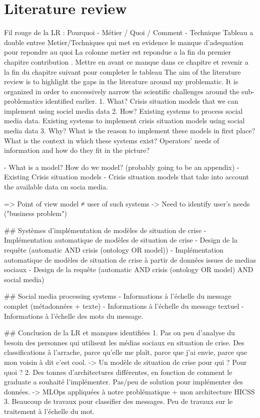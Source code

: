 \chapter{Literature review}

Fil rouge de la LR : Pourquoi - Métier / Quoi / Comment - Technique
Tableau a double entree Metier/Techniques qui met en evidence le manque d'adequation pour repondre au quoi
La colonne metier est repondue a la fin du premier chapitre contribution . Mettre en avant ce manque dans ce chapitre et revenir a la fin du chapitre suivant pour completer le tableau
The aim of the literature review is to highlight the gaps in the literature around my problematic.
It is organized in order to successively narrow the scientific challenges around the sub-problematics identified earlier.
1. What? Crisis situation models that we can implement using sociel media data
2. How? Existing systems to process social media data. Existing systems to implement crisis situation models using social media data
3. Why? What is the reason to implement these models in first place? What is the context in which these systems exist? Operators' needs of information and how do they fit in the picture?

- What is a model? How do we model? (probably going to be an appendix)
- Existing Crisis situation models
- Crisis situation models that take into account the available data on socia media.

=> Point of view model ≠ user of such systems
-> Need to identify user's needs ("business problem")

## Systèmes d'implémentation de modèles de situation de crise
- Implémentation automatique de modèles de situation de crise
- Design de la requête (automatic AND crisis (ontology OR model))
- Implémentation automatique de modèles de situation de crise à partir de données issues de medias sociaux
- Design de la requête (automatic AND crisis (ontology OR model) AND social media)

## Social media processing systems
- Informations à l'échelle du message complet (métadonnées + texte)
- Informations à l'échelle du message textuel
- Informations à l'échelle des mots du message.

## Conclusion de la LR et manques identifiées
1. Pas ou peu d'analyse du besoin des personnes qui utilisent les médias sociaux en situation de crise. Des classifications à l'arrache, parce qu'elle me plaît, parce que j'ai envie, parce que mon voisin à dit c'est cool.
-> Un modèle de situation de crise pour qui ? Pour quoi ?
2. Des tonnes d'architectures différentes, en fonction de comment le graduate a souhaité l'implémenter. Pas/peu de solution pour implémenter des données.
-> MLOps appliquées à notre problématique + mon architecture HICSS
3. Beaucoup de travaux pour classifier des messages. Peu de travaux sur le traitement à l'échelle du mot.%

